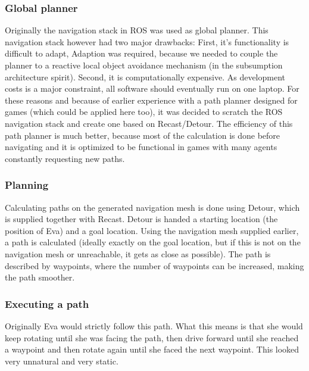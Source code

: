 \documentclass[project_eva.tex]{subfiles}
\begin{document}
\subsubsection*{Global planner}
Originally the navigation stack in ROS was used as global planner. This navigation stack however had two major drawbacks: First, it's functionality is difficult to adapt, Adaption was required, because we needed to couple the planner to a reactive local object avoidance mechanism (in the subsumption architecture spirit). Second, it is computationally expensive. As development costs is a major constraint, all software should eventually run on one laptop. For these reasons and because of earlier experience with a path planner designed for games (which could be applied here too), it was decided to scratch the ROS navigation stack and create one based on Recast/Detour. The efficiency of this path planner is much better, because most of the calculation is done before navigating and it is optimized to be functional in games with many agents constantly requesting new paths.

\subsubsection*{Planning}
Calculating paths on the generated navigation mesh is done using Detour, which is supplied together with Recast. Detour is handed a starting location (the position of Eva) and a goal location. Using the navigation mesh supplied earlier, a path is calculated (ideally exactly on the goal location, but if this is not on the navigation mesh or unreachable, it gets as close as possible). The path is described by waypoints, where the number of waypoints can be increased, making the path smoother.

\subsubsection*{Executing a path}
Originally Eva would strictly follow this path. What this means is that she would keep rotating until she was facing the 
path, then drive forward until she reached a waypoint and then rotate again until she faced the next waypoint. This looked very unnatural and very static. 
\end{document}
